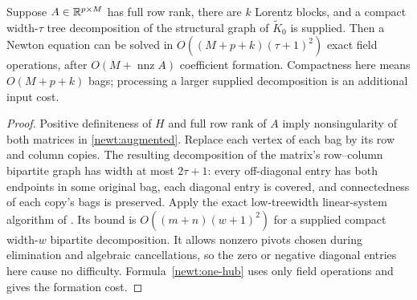 \begin{proposition}
\label{newt:treewidth}
Suppose $A\in\mathbb R^{p\times M}$ has full row rank, there are $k$ Lorentz
blocks, and a compact width-$\tau$ tree decomposition of the structural
graph of $\widetilde K_0$ is supplied.  Then a Newton equation can be
solved in $O((M+p+k)(\tau+1)^2)$ exact field operations, after
$O(M+\operatorname{nnz}A)$ coefficient formation.  Compactness here
means $O(M+p+k)$ bags; processing a larger supplied decomposition is an
additional input cost.
\end{proposition}
\begin{proof}
Positive definiteness of $H$ and full row rank of $A$ imply nonsingularity
of both matrices in \eqref{newt:augmented}.  Replace each vertex of each
bag by its row and column copies.  The resulting decomposition of the
matrix's row--column bipartite graph has width at most $2\tau+1$:
every off-diagonal entry has both endpoints in some original bag, each
diagonal entry is covered, and connectedness of each copy's bags is
preserved.  Apply the exact low-treewidth linear-system algorithm of
\citet[Corollary~3]{FurerHoppenTrevisan2025}.  Its bound is
$O((m+n)(w+1)^2)$ for a supplied compact width-$w$ bipartite
decomposition.  It allows nonzero pivots chosen during elimination and
algebraic cancellations, so the zero or negative diagonal entries here
cause no difficulty.  Formula~\eqref{newt:one-hub} uses only field
operations and gives the formation cost.
\end{proof}

